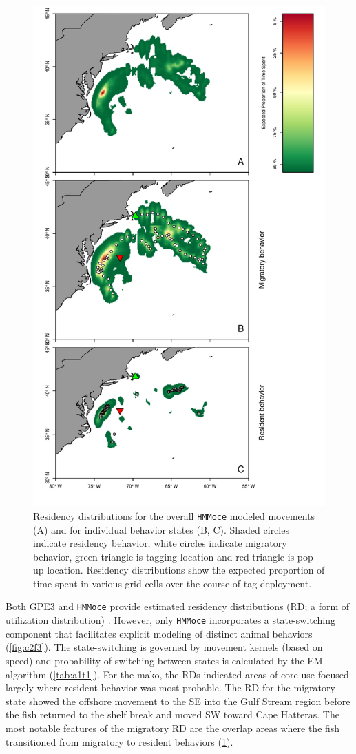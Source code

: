 \begin{figure}[p!]
\centering
\includegraphics[width=.8\textwidth]{images/C2_Fig4.pdf}
\caption[Residency distribution results from \texttt{HMMoce}]{Residency distributions for the overall \texttt{HMMoce}
modeled movements (A) and for individual behavior states (B, C). Shaded
circles indicate residency behavior, white circles indicate migratory
behavior, green triangle is tagging location and red triangle is pop-up
location. Residency distributions show the expected proportion of time
spent in various grid cells over the course of tag deployment.}
\label{fig:c2f4}
\end{figure}


Both GPE3 and \texttt{HMMoce} provide estimated residency distributions
(RD; a form of utilization distribution) \citep{Pedersen2011}. However,
only \texttt{HMMoce} incorporates a state-switching component that
facilitates explicit modeling of distinct animal behaviors (\cref{fig:c2f3}). The state-switching is governed by movement kernels
(based on speed) and probability of switching between states is
calculated by the EM algorithm (\cref{tab:a1t1}). For the mako, the RDs
indicated areas of core use focused largely where resident behavior was
most probable. The RD for the migratory state showed the offshore
movement to the SE into the Gulf Stream region before the fish returned
to the shelf break and moved SW toward Cape Hatteras. The most notable
features of the migratory RD are the overlap areas where the fish
transitioned from migratory to resident behaviors (\cref{fig:c2f4}).

